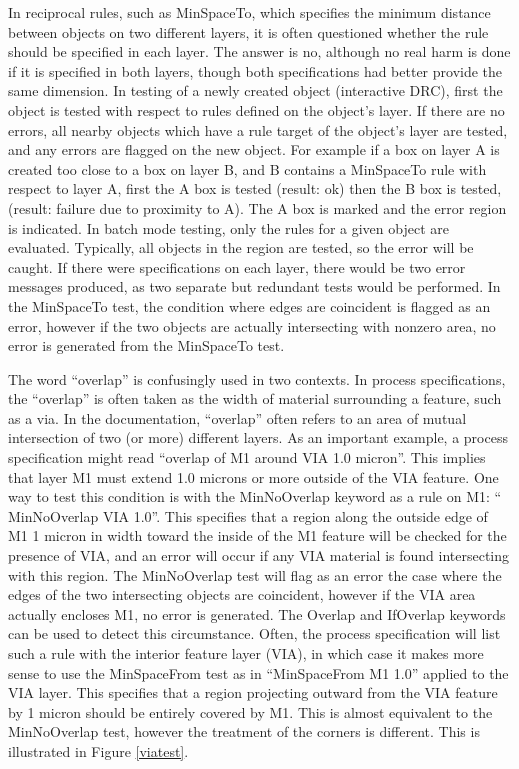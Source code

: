 In reciprocal rules, such as {\et MinSpaceTo}, which specifies the
minimum distance between objects on two different layers, it is often
questioned whether the rule should be specified in each layer.  The
answer is no, although no real harm is done if it is specified in both
layers, though both specifications had better provide the same
dimension.  In testing of a newly created object (interactive DRC),
first the object is tested with respect to rules defined on the
object's layer.  If there are no errors, all nearby objects which have
a rule target of the object's layer are tested, and any errors are
flagged on the new object.  For example if a box on layer A is created
too close to a box on layer B, and B contains a {\et MinSpaceTo} rule
with respect to layer A, first the A box is tested (result: ok) then
the B box is tested, (result: failure due to proximity to A).  The A
box is marked and the error region is indicated.  In batch mode
testing, only the rules for a given object are evaluated.  Typically,
all objects in the region are tested, so the error will be caught.  If
there were specifications on each layer, there would be two error
messages produced, as two separate but redundant tests would be
performed.  In the {\et MinSpaceTo} test, the condition where edges
are coincident is flagged as an error, however if the two objects
are actually intersecting with nonzero area, no error is generated
from the {\et MinSpaceTo} test.

The word ``overlap'' is confusingly used in two contexts.  In process
specifications, the ``overlap'' is often taken as the width of
material surrounding a feature, such as a via.  In the {\Xic}
documentation, ``overlap'' often refers to an area of mutual
intersection of two (or more) different layers.  As an important
example, a process specification might read ``overlap of M1 around VIA
1.0 micron''.  This implies that layer M1 must extend 1.0 microns or
more outside of the VIA feature.  One way to test this condition is
with the {\et MinNoOverlap} keyword as a rule on M1:  ``{\vt
MinNoOverlap VIA 1.0}''.  This specifies that a region along the
outside edge of M1 1 micron in width toward the inside of the M1
feature will be checked for the presence of VIA, and an error will
occur if any VIA material is found intersecting with this region.  The
{\et MinNoOverlap} test will flag as an error the case where the edges
of the two intersecting objects are coincident, however if the VIA
area actually encloses M1, no error is generated.  The {\et Overlap}
and {\et IfOverlap} keywords can be used to detect this circumstance. 
Often, the process specification will list such a rule with the
interior feature layer (VIA), in which case it makes more sense to use
the {\et MinSpaceFrom} test as in ``{\vt MinSpaceFrom M1 1.0}''
applied to the VIA layer.  This specifies that a region projecting
outward from the VIA feature by 1 micron should be entirely covered by
M1.  This is almost equivalent to the {\et MinNoOverlap} test, however
the treatment of the corners is different.  This is illustrated in
Figure \ref{viatest}.

